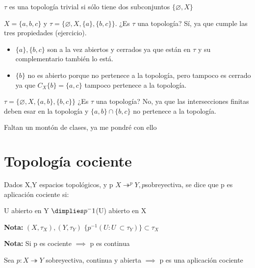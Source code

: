 \documentclass[palatino]{apuntes}
\begin{document}
\begin{defn}
$\tau$ es una topología trivial si sólo tiene dos subconjuntos $\{\varnothing,X\}$
\end{defn}



\begin{example}
$X = \{a,b,c\}$ y $\tau = \{\varnothing, X, \{a\}, \{b,c\}\}$. ¿Es $\tau$ una topología? Sí, ya que cumple las tres propiedades (ejercicio).
\begin{itemize}
	\item $\{a\}, \{b,c\}$ son a la vez abiertos y cerrados ya que están en $\tau$ y su complementario también lo está.
	\item $\{b\}$ no es abierto porque no pertenece a la topología, pero tampoco es cerrado ya que $C_X\{b\}=\{a,c\}$ tampoco pertenece a la topología.
\end{itemize}
\end{example}



\begin{problem}
$\tau = \{\varnothing,X,\{a,b\},\{b,c\}\}$ ¿Es $\tau$ una topología?
\solution
No, ya que las intersecciones finitas deben esar en la topología y $\{a,b\} \cap \{b,c\}$ no pertenece a la topología.
\end{problem}


Faltan un montón de clases, ya me pondré con ello




\section{Topología cociente}

\begin{dfn}
Dados X,Y espacios topológicos, y p $X\twoheadrightarrow^p Y, p$sobreyectiva, se dice que p es aplicación cociente si:

U abierto en Y $\dimplies p^-1$(U) abierto en X
\end{dfn}

\textbf{Nota:} $(X, \tau_X), (Y, \tau_Y)$ $\{p^{-1}(U: U\ \subset \tau_Y)\} \subset \tau_X$

\textbf{Nota:} Si p es cociente $\implies$ p es continua

\begin{prop}
Sea $p: X \twoheadrightarrow Y$ sobreyectiva, continua y abierta $\implies$ p es una aplicación cociente
\end{prop}
\end{document}
